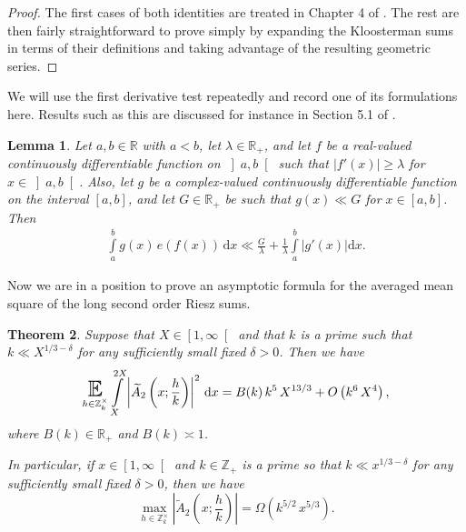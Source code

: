 \documentclass[a4paper,10pt,twoside]{amsart}
\newtheorem{theorem}{Theorem}[section]
\newtheorem{lemma}[theorem]{Lemma}
\theoremstyle{definition}
\numberwithin{equation}{section}
\newcommand\E{\mathbb{E}}
\renewcommand\:{\colon}
\begin{document}
\begin{proof}
The first cases of both identities are treated in Chapter 4 of \cite{Iwaniec}. The rest are then fairly straightforward to prove simply by expanding the Kloosterman sums in terms of their definitions and taking advantage of the resulting geometric series.
\end{proof}


\noindent We will use the first derivative test repeatedly and record one of its formulations here. Results such as this are discussed for instance in Section 5.1 of \cite{Huxley}.
\begin{lemma}\label{Lemma-Huxley}
Let $a,b\in\mathbb R$ with $a<b$, let $\lambda\in\mathbb R_+$, and let $f$ be a real-valued continuously differentiable function on $\left]a,b\right[$ such that $\left|f'(x)\right|\geqslant\lambda$ for $x\in\left]a,b\right[$. Also, let $g$ be a complex-valued continuously differentiable function on the interval $\left[a,b\right]$, and let $G\in\mathbb R_+$ be such that $g(x)\ll G$ for $x\in\left[a,b\right]$. Then
\begin{align*}
\int\limits_a^bg(x)\,e\!\left(f(x)\right)\,\mathrm dx\ll\frac G{\lambda}+\frac1{\lambda}\int\limits_a^b\left|g'(x)\right|\mathrm d x. 
\end{align*}
\end{lemma}

\noindent Now we are in a position to prove an asymptotic formula for the averaged mean square of the long second order Riesz sums.
\begin{theorem}\label{A_2-meansquare}
Suppose that $X\in\left[1,\infty\right[$ and that $k$ is a prime such that $k\ll X^{1/3-\delta}$ for any sufficiently small fixed $\delta>0$. Then we have
\begin{align*}
\mathop{\text{\LARGE$\E$}}_{h\in\mathbb Z_k^\times}\int\limits_X^{2X}\left|\widetilde A_2\left(x;\frac hk\right)\right|^2\,\mathrm dx=B(k)\,k^5\,X^{13/3}+O\left(k^{6}\,X^4\right),
\end{align*}
where $B(k)\in\mathbb R_+$ and $B(k)\asymp1$. 

In particular, if $x\in\left[1,\infty\right[$ and $k\in\mathbb Z_+$ is a prime so that $k\ll x^{1/3-\delta}$ for any sufficiently small fixed $\delta>0$, then we have
\[\max_{h\in\mathbb Z_k^\times}\left|\widetilde A_2\!\left(x;\frac hk\right)\right|=\Omega\left(k^{5/2}\,x^{5/3}\right).\]
\end{theorem}
\end{document}

